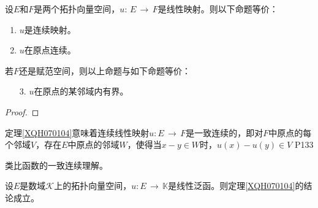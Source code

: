 \begin{theorem}\label{XQHthe070104}
	设$E$和$F$是两个拓扑向量空间，$u:\, E\, \rightarrow \, F $是线性映射。则以下命题等价：
	\begin{enumerate}
		\item $u$是连续映射。
		\item $u$在原点连续。
	\end{enumerate}
	若$F$还是赋范空间，则以上命题与如下命题等价：
	\begin{enumerate}
		\item[3.] $u$在原点的某邻域内有界。 
	\end{enumerate}
\end{theorem}

\begin{proof}
	
\end{proof}

\original
{定理\ref{XQH070104}意味着连续线性映射$u:E\, \rightarrow \, F $是一致连续的，即对$F$中原点的每个邻域$V$，存在$E$中原点的邻域$W$，使得当$x-y\in W $时，$u(x)-u(y) \in V $
}
{P133}
\begin{remark}
	类比函数的一致连续理解。
\end{remark}

\begin{corollary}
	设$E$是数域$\mathcal{K}$上的拓扑向量空间，$u:E\, \rightarrow \, \mathbb{K} $是线性泛函。则定理\ref{XQH070104}的结论成立。
\end{corollary}









